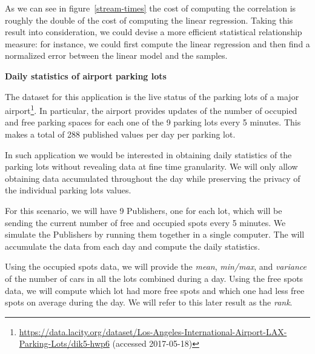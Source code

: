 As we can see in figure~\ref{stream-times} the cost of computing the
correlation is roughly the double of the cost of computing the linear
regression.  Taking this result into consideration, we could devise a more
efficient statistical relationship measure: for instance, we could first
compute the linear regression and then find a normalized error between the
linear model and the samples.

\bigskip
\noindent\textbf{Daily statistics of airport parking lots}

The dataset for this application is the live status of the parking lots of a
major
airport\footnote{\url{https://data.lacity.org/dataset/Los-Angeles-International-Airport-LAX-Parking-Lots/dik5-hwp6}
(accessed 2017-05-18)}.  In particular, the airport provides updates of the
number of occupied and free parking spaces for each one of the 9 parking lots
every 5 minutes.  This makes a total of 288 published values per day per
parking lot.

In such application we would be interested in obtaining daily statistics of the
parking lots without revealing data at fine time granularity.  We will only
allow obtaining data accumulated throughout the day while preserving the
privacy of the individual parking lots values.

For this scenario, we will have 9 Publishers, one for each lot, which will be
sending the current number of free and occupied spots every 5 minutes.  We
simulate the Publishers by running them together in a single computer.  The
\broker will accumulate the data from each day and compute the daily statistics.

Using the occupied spots data, we will provide the \emph{mean}, \emph{min/max},
and \emph{variance} of the number of cars in all the lots combined during a
day.  Using the free spots data, we will compute which lot had more free spots
and which one had less free spots on average during the day.  We will refer to
this later result as the \emph{rank}.

